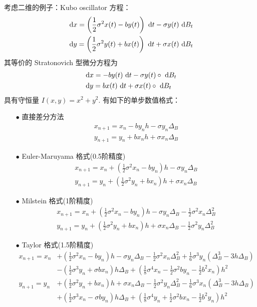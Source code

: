 考虑二维的例子：Kubo oscillator 方程：
\begin{equation}\label{eq_Kubo_ito}
\begin{aligned}
& \text{ d} x = \left(\frac12 \sigma^2 x(t) - by(t) \right)\text{ d} t -\sigma y(t)  \text{ d} B_t \\
& \text{ d} y =  \left(\frac12 \sigma^2 y(t)+ bx(t) \right)\text{ d} t + \sigma x(t)  \text{ d} B_t 
\end{aligned}
\end{equation}
其等价的 Stratonovich 型微分方程为
\begin{equation}\label{eq_Kubo_Str}
\begin{aligned}
& \text{ d} x = - by(t) \text{ d} t - \sigma y(t) \circ \text{ d} B_t \\
& \text{ d} y =   bx(t) \text{ d} t + \sigma x(t) \circ \text{ d} B_t 
\end{aligned}
\end{equation}
具有守恒量 $I(x,y) = x^2+y^2$. 有如下的单步数值格式：
\begin{enumerate}
	\item[$\bullet$] 直接差分方法
	\[
	\begin{aligned}
	x_{n+1} = x_n - by_nh - \sigma y_n \Delta_B \\
	y_{n+1} = y_n + bx_nh + \sigma x_n \Delta_B  
	\end{aligned}
	\]
	\item[$\bullet$] Euler-Maruyama 格式(0.5阶精度)
	\[
	\begin{aligned}
	x_{n+1} = x_n + (\frac12\sigma^2x_n-by_n)h - \sigma y_n \Delta_B \\
	y_{n+1} = y_n + (\frac12\sigma^2y_n+bx_n)h + \sigma x_n \Delta_B  
	\end{aligned}
	\]
	\item[$\bullet$] Milstein 格式(1阶精度)
	\[
	\begin{aligned}
	x_{n+1} = x_n + (\frac12\sigma^2x_n-by_n)h - \sigma y_n \Delta_B -\frac12\sigma^2x_n \Delta_B^2 \\
	y_{n+1} = y_n + (\frac12\sigma^2y_n+bx_n)h + \sigma x_n \Delta_B -\frac12\sigma^2y_n \Delta_B^2 
	\end{aligned}
	\]
	\item[$\bullet$] Taylor 格式(1.5阶精度)
	\[
	\begin{aligned}
	x_{n+1} = x_n &+ (\frac12\sigma^2x_n-by_n)h - \sigma y_n \Delta_B 
					 -\frac12\sigma^2x_n \Delta_B^2 
					+\frac16\sigma^3y_n(\Delta_B^3-3h\Delta_B)\\
				  &-(\frac12\sigma^3y_n+\sigma bx_n)h\Delta_B
				  +(\frac18\sigma^4x_n-\frac12\sigma^2by_n-\frac12b^2x_n)h^2\\
	y_{n+1} = y_n &+ (\frac12\sigma^2y_n+bx_n)h + \sigma x_n \Delta_B
					 -\frac12\sigma^2y_n \Delta_B^2 
					 -\frac16\sigma^3x_n(\Delta_B^3-3h\Delta_B)\\
				  &+(\frac12\sigma^3x_n-\sigma by_n)h\Delta_B
				  +(\frac18\sigma^4y_n+\frac12\sigma^2bx_n-\frac12b^2y_n)h^2
	\end{aligned}
	\]
\end{enumerate}
